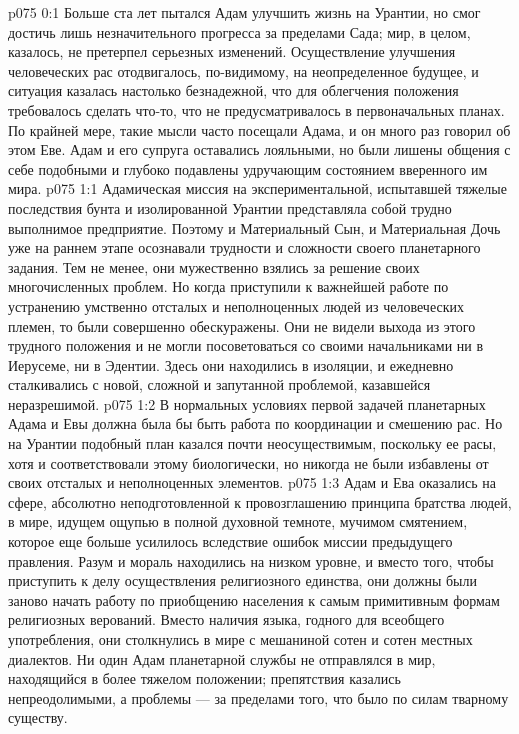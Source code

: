 \vs p075 0:1 Больше ста лет пытался Адам улучшить жизнь на Урантии, но смог достичь лишь незначительного прогресса за пределами Сада; мир, в целом, казалось, не претерпел серьезных изменений. Осуществление улучшения человеческих рас отодвигалось, по\hyp{}видимому, на неопределенное будущее, и ситуация казалась настолько безнадежной, что для облегчения положения требовалось сделать что\hyp{}то, что не предусматривалось в первоначальных планах. По крайней мере, такие мысли часто посещали Адама, и он много раз говорил об этом Еве. Адам и его супруга оставались лояльными, но были лишены общения с себе подобными и глубоко подавлены удручающим состоянием вверенного им мира.
\vs p075 1:1 Адамическая миссия на экспериментальной, испытавшей тяжелые последствия бунта и изолированной Урантии представляла собой трудно выполнимое предприятие. Поэтому и Материальный Сын, и Материальная Дочь уже на раннем этапе осознавали трудности и сложности своего планетарного задания. Тем не менее, они мужественно взялись за решение своих многочисленных проблем. Но когда приступили к важнейшей работе по устранению умственно отсталых и неполноценных людей из человеческих племен, то были совершенно обескуражены. Они не видели выхода из этого трудного положения и не могли посоветоваться со своими начальниками ни в Иерусеме, ни в Эдентии. Здесь они находились в изоляции, и ежедневно сталкивались с новой, сложной и запутанной проблемой, казавшейся неразрешимой.
\vs p075 1:2 В нормальных условиях первой задачей планетарных Адама и Евы должна была бы быть работа по координации и смешению рас. Но на Урантии подобный план казался почти неосуществимым, поскольку ее расы, хотя и соответствовали этому биологически, но никогда не были избавлены от своих отсталых и неполноценных элементов.
\vs p075 1:3 Адам и Ева оказались на сфере, абсолютно неподготовленной к провозглашению принципа братства людей, в мире, идущем ощупью в полной духовной темноте, мучимом смятением, которое еще больше усилилось вследствие ошибок миссии предыдущего правления. Разум и мораль находились на низком уровне, и вместо того, чтобы приступить к делу осуществления религиозного единства, они должны были заново начать работу по приобщению населения к самым примитивным формам религиозных верований. Вместо наличия языка, годного для всеобщего употребления, они столкнулись в мире с мешаниной сотен и сотен местных диалектов. Ни один Адам планетарной службы не отправлялся в мир, находящийся в более тяжелом положении; препятствия казались непреодолимыми, а проблемы --- за пределами того, что было по силам тварному существу.
